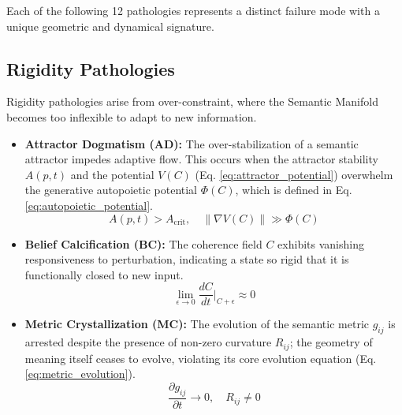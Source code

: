 Each of the following 12 pathologies represents a distinct failure mode with a unique geometric and dynamical signature.


\subsection{Rigidity Pathologies}
\label{sec:rigidity_pathologies}

Rigidity pathologies arise from over-constraint, where the Semantic Manifold becomes too inflexible to adapt to new information.

\begin{itemize}
    \item \textbf{Attractor Dogmatism (AD):} The over-stabilization of a semantic attractor impedes adaptive flow. This occurs when the attractor stability \(A(p,t)\) and the potential \(V(C)\) (Eq. \ref{eq:attractor_potential}) overwhelm the generative autopoietic potential \(\Phi(C)\), which is defined in Eq. \ref{eq:autopoietic_potential}.
    \begin{equation}
    A(p,t) > A_{\text{crit}}, \quad \|\nabla V(C)\| \gg \Phi(C)
    \end{equation}

    \item \textbf{Belief Calcification (BC):} The coherence field \(C\) exhibits vanishing responsiveness to perturbation, indicating a state so rigid that it is functionally closed to new input.
    \begin{equation}
    \lim_{\epsilon \to 0} \frac{dC}{dt}\bigg|_{C+\epsilon} \approx 0
    \end{equation}

    \item \textbf{Metric Crystallization (MC):} The evolution of the semantic metric \(g_{ij}\) is arrested despite the presence of non-zero curvature \(R_{ij}\); the geometry of meaning itself ceases to evolve, violating its core evolution equation (Eq. \ref{eq:metric_evolution}).
    \begin{equation}
    \frac{\partial g_{ij}}{\partial t} \to 0, \quad R_{ij} \neq 0
    \end{equation}
\end{itemize}


